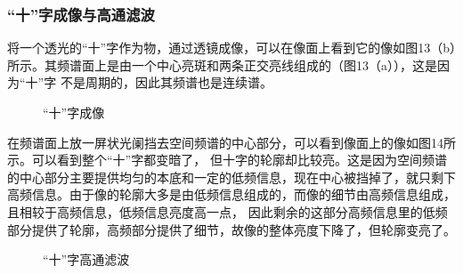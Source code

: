 \documentclass{article}
\begin{document}
    \subsubsection{“十”字成像与高通滤波}
    将一个透光的“十”字作为物，通过透镜成像，可以在像面上看到它的像如图13（b）所示。其频谱面上是由一个中心亮斑和两条正交亮线组成的（图13（a）），这是因为“十”字
    不是周期的，因此其频谱也是连续谱。
    \begin{figure}[h]
        \centering
        \caption{“十”字成像}
    \end{figure}

    在频谱面上放一屏状光阑挡去空间频谱的中心部分，可以看到像面上的像如图14所示。可以看到整个“十”字都变暗了，
    但十字的轮廓却比较亮。这是因为空间频谱的中心部分主要提供均匀的本底和一定的低频信息，现在中心被挡掉了，就只剩下
    高频信息。由于像的轮廓大多是由低频信息组成的，而像的细节由高频信息组成，且相较于高频信息，低频信息亮度高一点，
    因此剩余的这部分高频信息里的低频部分提供了轮廓，高频部分提供了细节，故像的整体亮度下降了，但轮廓变亮了。
    \begin{figure}[h]
        \centering
        \caption{“十”字高通滤波}
    \end{figure}
\end{document}
